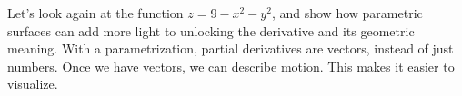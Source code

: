 %
%

Let's look again at the function $z=9-x^2-y^2$, and show how parametric surfaces can add more light to unlocking the derivative and its geometric meaning. With a parametrization, partial derivatives are vectors, instead of just numbers.  Once we have vectors, we can describe motion. This makes it easier to visualize.

